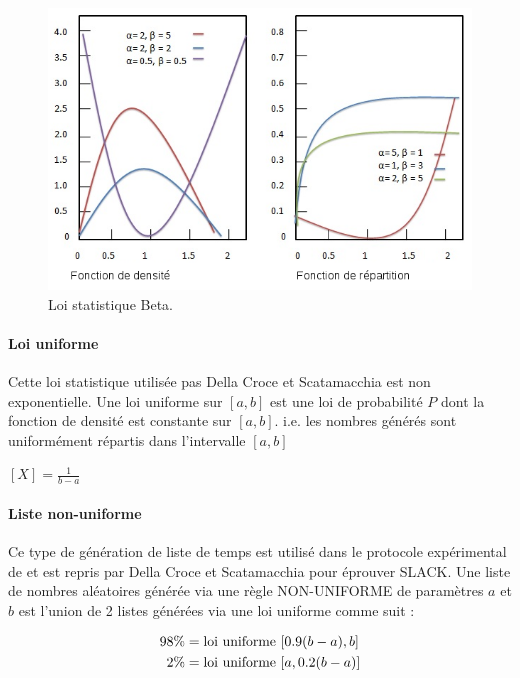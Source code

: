 \documentclass[a4paper,12pt]{report}
\theoremstyle{plain}				%
\theoremstyle{definition}				%
\newcommand\dcs{Della Croce et Scatamacchia\xspace}
\begin{document}
\begin{figure}
{\centering
\includegraphics[width=\columnwidth]{loiStatBeta.png}
\caption{Loi statistique Beta.}
\label{fig:LoiStatistiquesBeta}
\par}
\end{figure}



\paragraph{Loi uniforme} 
Cette loi statistique utilisée pas \dcs est non exponentielle. 
Une loi uniforme sur $[a, b]$ est une loi de probabilité $P$ dont la fonction de densité est 
  constante sur $[a, b]$. i.e. les nombres générés sont uniformément répartis dans l'intervalle $[a, b]$

\begin{center}
$[X] = \frac{1}{b-a}$
\end{center}

\paragraph{Liste non-uniforme}
Ce type de génération de liste de temps est utilisé dans le protocole expérimental de \cite{frangioni2004multi} et est repris par \dcs \cite{della2020longest} pour éprouver SLACK.
Une liste de nombres aléatoires générée via une règle NON-UNIFORME de paramètres $a$ et $b$ 
  est l'union de 2 listes générées via une loi uniforme comme suit :

\begin{align*}
	98 \%  &= \textnormal{loi uniforme } [0.9(b-a), b] \\
	2\%    &= \textnormal{loi uniforme } [a, 0.2(b-a)] 
\end{align*}
\end{document}
